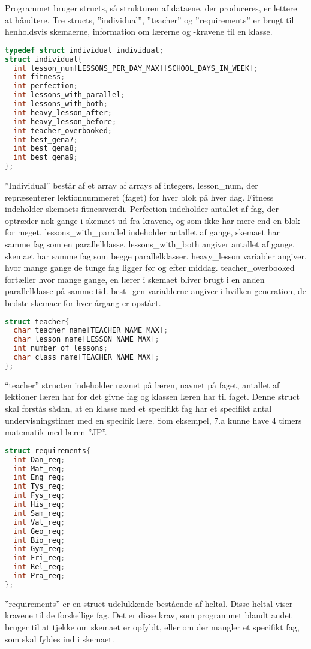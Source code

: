 Programmet bruger structs, så strukturen af dataene, der produceres, er lettere at håndtere. Tre structs, ”individual”, ”teacher” og ”requirements” er brugt til henholdsvis skemaerne, information om lærerne og -kravene til en klasse.

\begin{lstlisting}[language = C]
typedef struct individual individual;
struct individual{
  int lesson_num[LESSONS_PER_DAY_MAX][SCHOOL_DAYS_IN_WEEK];
  int fitness;
  int perfection;
  int lessons_with_parallel;
  int lessons_with_both;
  int heavy_lesson_after;
  int heavy_lesson_before;
  int teacher_overbooked;
  int best_gena7;
  int best_gena8;
  int best_gena9;
};
\end{lstlisting}

”Individual” består af et array af arrays af integers, lesson\_num, der repræsenterer lektionnummeret (faget) for hver blok på hver dag. Fitness indeholder skemaets fitnessværdi. Perfection indeholder antallet af fag, der optræder nok gange i skemaet ud fra kravene, og som ikke har mere end en blok for meget. lessons\_with\_parallel indeholder antallet af gange, skemaet har samme fag som en parallelklasse. lessons\_with\_both angiver antallet af gange, skemaet har samme fag som begge parallelklasser. heavy\_lesson variabler angiver, hvor mange gange de tunge fag ligger før og efter middag. teacher\_overbooked fortæller hvor mange gange, en lærer i skemaet bliver brugt i en anden parallelklasse på samme tid. best\_gen variablerne angiver i hvilken generation, de bedste skemaer for hver årgang er opstået.

\begin{lstlisting}[language = C]
struct teacher{
  char teacher_name[TEACHER_NAME_MAX];
  char lesson_name[LESSON_NAME_MAX];
  int number_of_lessons;
  char class_name[TEACHER_NAME_MAX];
};
\end{lstlisting}

“teacher” structen indeholder navnet på læren, navnet på faget, antallet af lektioner læren har for det givne fag og klassen læren har til faget. Denne struct skal forstås sådan, at en klasse med et specifikt fag har et specifikt antal undervisningstimer med en specifik lære. Som eksempel, 7.a kunne have 4 timers matematik med læren ”JP”. 

\begin{lstlisting}[language = C]
struct requirements{
  int Dan_req;
  int Mat_req;
  int Eng_req;
  int Tys_req;
  int Fys_req;
  int His_req;
  int Sam_req;
  int Val_req;
  int Geo_req;
  int Bio_req;
  int Gym_req;
  int Fri_req;
  int Rel_req;
  int Pra_req;
};
\end{lstlisting}

”requirements” er en struct udelukkende bestående af heltal. Disse heltal viser kravene til de forskellige fag. Det er disse krav, som programmet blandt andet bruger til at tjekke om skemaet er opfyldt, eller om der mangler et specifikt fag, som skal fyldes ind i skemaet.
\newpage